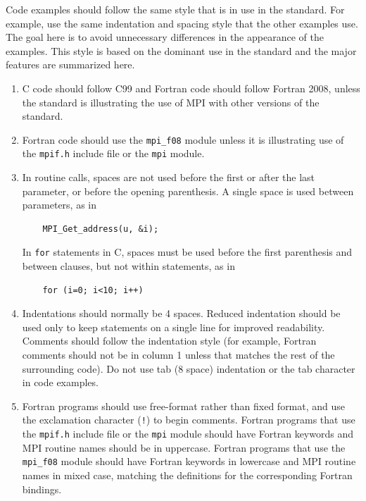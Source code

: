 \documentclass[letterpaper,twoside,11pt,fleqn]{article}
\def\MPI/{\textsf{MPI}}    %
\begin{document}
Code examples should follow the same style that is in use in the
standard.
For example, use the same indentation and spacing style that the other
examples use.
The goal here is to avoid unnecessary differences in the appearance of
the examples.
This style is based on the dominant use in the standard and the major
features are summarized here.
\begin{enumerate}
\item C code should follow C99 and Fortran code should follow Fortran
  2008, unless the standard is illustrating the use of \MPI/ with
  other versions of the standard.
\item %
Fortran code should use the \texttt{mpi\_f08} module unless it is
illustrating use of the \texttt{mpif.h} include file or the
\texttt{mpi} module.
\item In routine calls, spaces are not used before the first or after
  the last parameter, or before the opening parenthesis.
  A single space is used between parameters, as in
\begin{verbatim}
    MPI_Get_address(u, &i);
\end{verbatim}

In \texttt{for} statements in C, spaces must be used before the first
parenthesis and between clauses, but not within statements, as in
\begin{verbatim}
    for (i=0; i<10; i++)
\end{verbatim}

\item Indentations should normally be 4 spaces.  Reduced indentation
  should be used only to keep statements on a single line for improved
  readability.  Comments should follow the indentation style (for
  example, Fortran comments should not be in column 1 unless that
  matches the rest of the surrounding code).
  Do not use tab (8 space) indentation or the tab character in code
  examples.
\item Fortran programs should use free-format rather than fixed format,
  and use the exclamation character (\texttt{!}) to begin comments.
  Fortran programs that use the \texttt{mpif.h} include file or the
  \texttt{mpi} module should have Fortran keywords and \MPI/
  routine names should be in uppercase. Fortran programs that use the
  \texttt{mpi\_f08} module should have Fortran keywords in lowercase
  and \MPI/ routine names in mixed case, matching the definitions for
  the corresponding Fortran bindings.


\end{enumerate}
\end{document}
